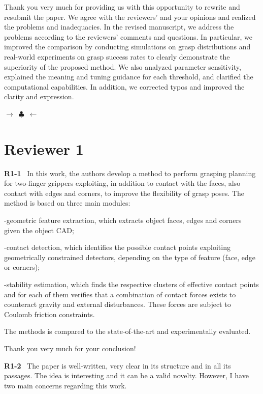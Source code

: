 \documentclass[journal]{IEEEtran}
\newcommand{\ornamentbreak}{%
\begin{center}
    $\longrightarrow$~$\clubsuit$~$\longleftarrow$
  \end{center}
}
\begin{document}
Thank you very much for providing us with this opportunity to rewrite and resubmit the paper. We agree with the reviewers' and your opinions and realized the problems and inadequacies. In the revised manuscript, we address the problems according to the reviewers' comments and questions. In particular, we improved the comparison by conducting simulations on grasp distributions and real-world experiments on grasp success rates to clearly demonstrate the superiority of the proposed method. We also analyzed parameter sensitivity, explained the meaning and tuning guidance for each threshold, and clarified the computational capabilities. In addition, we corrected typos and improved the clarity and expression.

\noindent
\ornamentbreak
\section{Reviewer 1}

\noindent
{\textbf{\color{black}R1-1}\color{gray}~
In this work, the authors develop a method to perform grasping planning for two-finger grippers exploiting, in addition to contact with the faces, also contact with edges and corners, to improve the flexibility of grasp poses. The method is based on three main modules:

-geometric feature extraction, which extracts object faces, edges and corners given the object CAD;

-contact detection, which identifies the possible contact points exploiting geometrically constrained detectors, depending on the type of feature (face, edge or corners);

-stability estimation, which finds the respective clusters of effective contact points and for each of them verifies that a combination of contact forces exists to counteract gravity and external disturbances. These forces are subject to Coulomb friction constraints.

The methods is compared to the state-of-the-art and experimentally evaluated.
}

Thank you very much for your conclusion!
\\
\bigskip

\noindent
{\textbf{\color{black}R1-2}\color{gray}~
The paper is well-written, very clear in its structure and in all its passages. The idea is interesting and it can be a valid novelty. However, I have two main concerns regarding this work.
}
\end{document}
